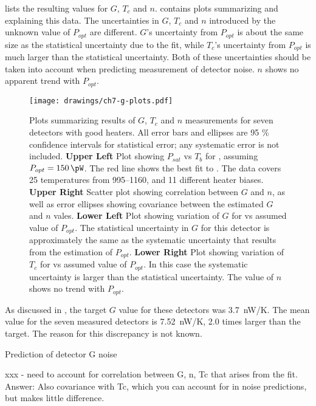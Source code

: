  lists the resulting values for $G$, $T_c$ and $n$.
 contains plots summarizing and explaining this data.
The uncertainties in $G$, $T_c$ and $n$ introduced by the unknown value of $P_{opt}$ are different.
$G$'s uncertainty from $P_{opt}$ is about the same size as the statistical uncertainty due to the fit, while $T_c$'s uncertainty from $P_{opt}$ is much larger than the statistical uncertainty.
Both of these uncertainties should be taken into account when predicting measurement of detector noise.
$n$ shows no apparent trend with $P_{opt}$.

\begin{figure*}
\texttt{[image: drawings/ch7-g-plots.pdf]}
\caption{Plots summarizing results of $G$, $T_c$ and $n$ measurements for seven detectors with good heaters.
All error bars and ellipses are 95 \% confidence intervals for statistical error; any systematic error is not included.
\textbf{Upper Left} Plot showing $P_{sat}$ vs $T_b$ for , assuming $P_{opt} = \SI{150}{\pW}$.
The red line shows the best fit to .
The data covers 25 temperatures from \SIrange{995}{1160}{\mK}, and 11 different heater biases.
\textbf{Upper Right} Scatter plot showing correlation between $G$ and $n$, as well as error ellipses showing covariance between the estimated $G$ and $n$ vales.
\textbf{Lower Left} Plot showing variation of $G$ for  vs assumed value of $P_{opt}$.
The statistical uncertainty in $G$ for this detector is approximately the same as the systematic uncertainty that results from the estimation of $P_{opt}$.
\textbf{Lower Right} Plot showing variation of $T_c$ for  vs assumed value of $P_{opt}$.
In this case the systematic uncertainty is larger than the statistical uncertainty.
The value of $n$ shows no trend with $P_{opt}$.
} 
\label{fig:heater-g-plots}
\end{figure*}

As discussed in , the target $G$ value for these detectors was 3.7~nW/K.
The mean value for the seven measured detectors is 7.52~nW/K, 2.0 times larger than the target.
The reason for this discrepancy is not known.

Prediction of detector G noise

xxx - need to account for correlation between G, n, Tc that arises from the fit.
Answer: Also covariance with Tc, which you can account for in noise predictions, but makes little difference.

